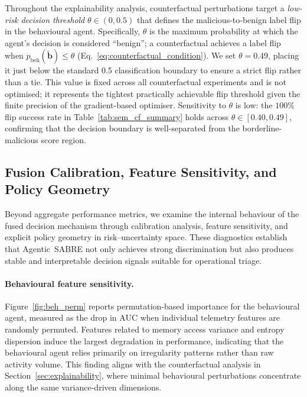 \documentclass[lettersize,journal]{IEEEtran}
\begin{document}
Throughout the explainability analysis, counterfactual perturbations target a
\emph{low-risk decision threshold} $\theta \in (0, 0.5)$ that defines the malicious-to-benign
label flip in the behavioural agent. Specifically, $\theta$ is the maximum probability at
which the agent's decision is considered ``benign''; a counterfactual achieves a label flip
when $p_{\mathrm{beh}}(\tilde{\mathbf{b}}) \le \theta$ (Eq.~\ref{eq:counterfactual_condition}).
We set $\theta = 0.49$, placing it just below the standard 0.5 classification boundary to
ensure a strict flip rather than a tie. This value is fixed across all counterfactual
experiments and is not optimised; it represents the tightest practically achievable flip
threshold given the finite precision of the gradient-based optimiser. Sensitivity to $\theta$
is low: the $100\%$ flip success rate in Table~\ref{tab:sem_cf_summary} holds across
$\theta \in [0.40, 0.49]$, confirming that the decision boundary is well-separated from the
borderline-malicious score region.

\subsection{Fusion Calibration, Feature Sensitivity, and Policy Geometry}
\label{sec:fusion_analysis}

Beyond aggregate performance metrics, we examine the internal behaviour of the fused decision mechanism through calibration analysis, feature sensitivity, and explicit policy geometry in risk--uncertainty space. These diagnostics establish that Agentic~SABRE not only achieves strong discrimination but also produces stable and interpretable decision signals suitable for operational triage.

\paragraph{Behavioural feature sensitivity.}
Figure~\ref{fig:beh_perm} reports permutation-based importance for the behavioural agent, measured as the drop in AUC when individual telemetry features are randomly permuted. Features related to memory access variance and entropy dispersion induce the largest degradation in performance, indicating that the behavioural agent relies primarily on irregularity patterns rather than raw activity volume. This finding aligns with the counterfactual analysis in Section~\ref{sec:explainability}, where minimal behavioural perturbations concentrate along the same variance-driven dimensions.
\end{document}
